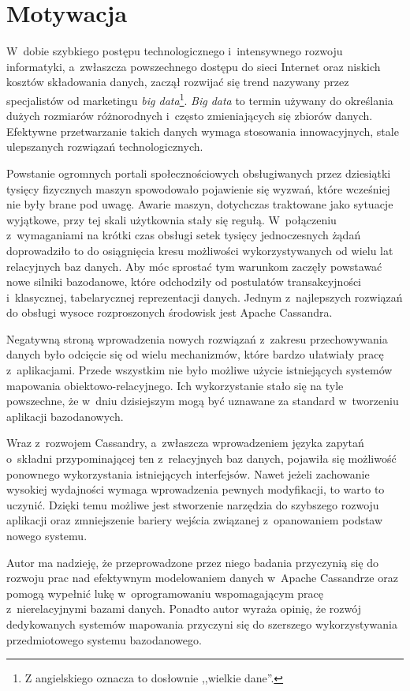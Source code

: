 \section{Motywacja}
\label{sec:motivation}

W~dobie szybkiego postępu technologicznego i~intensywnego rozwoju informatyki, a~zwłaszcza powszechnego dostępu do sieci Internet oraz niskich kosztów składowania danych, zaczął rozwijać się trend nazywany przez specjalistów od marketingu \emph{big data}\footnote{Z angielskiego oznacza to dosłownie ,,wielkie dane''.}. \emph{Big data} to termin używany do określania dużych rozmiarów różnorodnych i~często zmieniających się zbiorów danych.~\cite{big_data_definition} Efektywne przetwarzanie takich danych wymaga stosowania innowacyjnych, stale ulepszanych rozwiązań technologicznych. 

Powstanie ogromnych portali społecznościowych obsługiwanych przez dziesiątki tysięcy fizycznych maszyn spowodowało pojawienie się wyzwań, które wcześniej nie były brane pod uwagę. Awarie maszyn, dotychczas traktowane jako sytuacje wyjątkowe, przy tej skali użytkownia stały się regułą. W~połączeniu z~wymaganiami na krótki czas obsługi setek tysięcy jednoczesnych żądań doprowadziło to do osiągnięcia kresu możliwości wykorzystywanych od wielu lat relacyjnych baz danych. Aby móc sprostać tym warunkom zaczęły powstawać nowe silniki bazodanowe, które odchodziły od postulatów transakcyjności i~klasycznej, tabelarycznej reprezentacji danych. Jednym z~najlepszych rozwiązań do obsługi wysoce rozproszonych środowisk jest Apache Cassandra.

Negatywną stroną wprowadzenia nowych rozwiązań z~zakresu przechowywania danych było odcięcie się od wielu mechanizmów, które bardzo ułatwiały pracę z~aplikacjami. Przede wszystkim nie było możliwe użycie istniejących systemów mapowania obiektowo-relacyjnego. Ich wykorzystanie stało się na tyle powszechne, że w~dniu dzisiejszym mogą być uznawane za standard w~tworzeniu aplikacji bazodanowych.

Wraz z~rozwojem Cassandry, a~zwłaszcza wprowadzeniem języka zapytań o~składni przypominającej ten z~relacyjnych baz danych, pojawiła się możliwość ponownego wykorzystania istniejących interfejsów. Nawet jeżeli zachowanie wysokiej wydajności wymaga wprowadzenia pewnych modyfikacji, to warto to uczynić. Dzięki temu możliwe jest stworzenie narzędzia do szybszego rozwoju aplikacji oraz zmniejszenie bariery wejścia związanej z~opanowaniem podstaw nowego systemu.

Autor ma nadzieję, że przeprowadzone przez niego badania przyczynią się do rozwoju prac nad efektywnym modelowaniem danych w~Apache Cassandrze oraz pomogą wypełnić lukę w~oprogramowaniu wspomagającym pracę z~nierelacyjnymi bazami danych. Ponadto autor wyraża opinię, że rozwój dedykowanych systemów mapowania przyczyni się do szerszego wykorzystywania przedmiotowego systemu bazodanowego.

